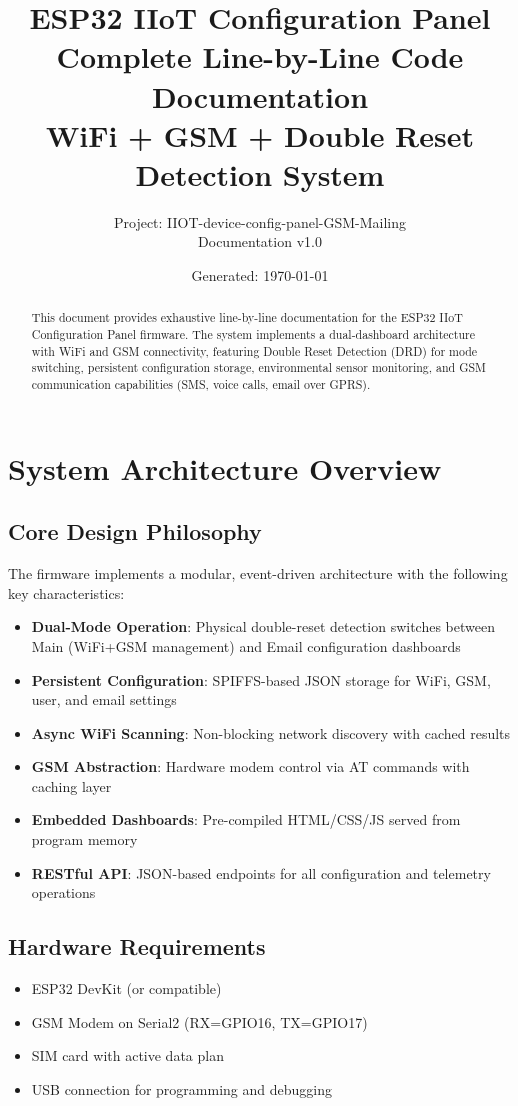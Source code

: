 \documentclass[11pt,a4paper]{article}
\title{ESP32 IIoT Configuration Panel\\
\large Complete Line-by-Line Code Documentation\\
\normalsize WiFi + GSM + Double Reset Detection System}
\author{Project: IIOT-device-config-panel-GSM-Mailing\\
Documentation v1.0}
\date{Generated: \today}
\begin{document}
\maketitle

\begin{abstract}
This document provides exhaustive line-by-line documentation for the ESP32 IIoT Configuration Panel firmware. The system implements a dual-dashboard architecture with WiFi and GSM connectivity, featuring Double Reset Detection (DRD) for mode switching, persistent configuration storage, environmental sensor monitoring, and GSM communication capabilities (SMS, voice calls, email over GPRS).
\end{abstract}

\tableofcontents
\newpage

\section{System Architecture Overview}

\subsection{Core Design Philosophy}
The firmware implements a modular, event-driven architecture with the following key characteristics:

\begin{itemize}[leftmargin=*]
  \item \textbf{Dual-Mode Operation}: Physical double-reset detection switches between Main (WiFi+GSM management) and Email configuration dashboards
  \item \textbf{Persistent Configuration}: SPIFFS-based JSON storage for WiFi, GSM, user, and email settings
  \item \textbf{Async WiFi Scanning}: Non-blocking network discovery with cached results
  \item \textbf{GSM Abstraction}: Hardware modem control via AT commands with caching layer
  \item \textbf{Embedded Dashboards}: Pre-compiled HTML/CSS/JS served from program memory
  \item \textbf{RESTful API}: JSON-based endpoints for all configuration and telemetry operations
\end{itemize}

\subsection{Hardware Requirements}
\begin{itemize}[leftmargin=*]
  \item ESP32 DevKit (or compatible)
  \item GSM Modem on Serial2 (RX=GPIO16, TX=GPIO17)
  \item SIM card with active data plan
  \item USB connection for programming and debugging
\end{itemize}
\end{document}
